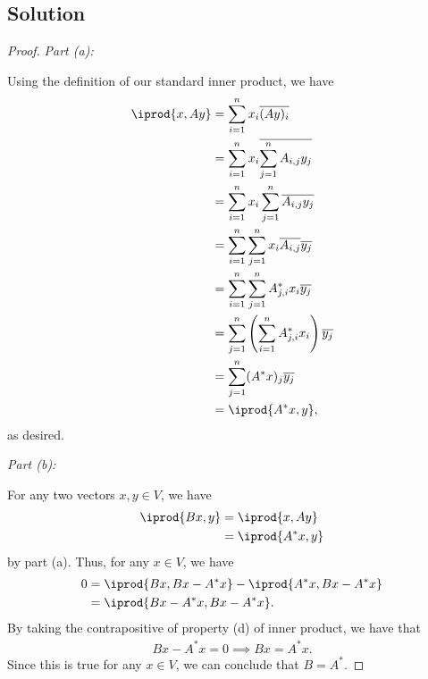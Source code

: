 \documentclass[10pt,a4paper]{article}
\makeatletter
\newcommand{\proofpart}[2]{%
  \par
  \addvspace{\medskipamount}%
  \noindent\emph{Part #1: #2}\par\nobreak
  \addvspace{\smallskipamount}%
  \@afterheading
}
\theoremstyle{definition}
\makeatother
\begin{document}
\subsection*{Solution}
\begin{proof}
\proofpart{(a)}{} Using the definition of our standard inner product, we have
\begin{align*}
\iprod{x, Ay} &= \sum_{i = 1}^n x_i \overline{(Ay)_i}\\
&= \sum_{i = 1}^n x_i \overline{\sum_{j = 1}^n A_{i, j}y_j}\\
&= \sum_{i = 1}^n x_i \sum_{j = 1}^n \overline{A_{i, j}y_j}\\
&= \sum_{i = 1}^n \sum_{j = 1}^n x_i \overline{A_{i, j}} \overline{y_j}\\
&= \sum_{i = 1}^n \sum_{j = 1}^n A_{j, i}^* x_i \overline{y_j}\\
&= \sum_{j = 1}^n \left( \sum_{i = 1}^n A_{j, i}^* x_i \right) \overline{y_j}\\
&= \sum_{j = 1}^n (A^*x)_j \overline{y_j}\\
&= \iprod{A^*x, y},
\end{align*}
as desired.

\proofpart{(b)}{} For any two vectors $x,y \in V$, we have
\begin{align*}
\iprod{Bx, y} &= \iprod{x, Ay}\\
&= \iprod{A^* x, y}
\end{align*}
by part (a). Thus, for any $x \in V$, we have
\begin{align*}
0 &= \iprod{Bx, Bx - A^*x} - \iprod{A^* x, Bx - A^*x}\\
&= \iprod{Bx - A^* x, Bx - A^*x}.
\end{align*}
By taking the contrapositive of property (d) of inner product, we have that 
\begin{align*}
Bx - A^*x = 0 \implies Bx = A^*x.
\end{align*}
Since this is true for any $x \in V$, we can conclude that $B = A^*$.
\end{proof}
\end{document}
